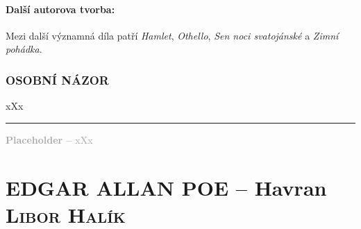 \documentclass[A4paper]{extarticle} %
\begin{document}
\subsection*{Další autorova tvorba:}
\noindent 
Mezi další významná díla patří \textit{Hamlet}, \textit{Othello}, \textit{Sen noci svatojánské} a \textit{Zimní pohádka}.






\section*{OSOBNÍ NÁZOR}
\noindent 
xXx

\vfill

\noindent\begin{minipage}{\textwidth}
    \textcolor{darkgray}{\rule{\linewidth}{0.4pt}
    \footnotesize
    \textbf{Placeholder --} xXx
    }
\end{minipage}


\newpage


\changefontsize{7pt}

\part*{EDGAR ALLAN POE -- Havran {\hfill \normalfont\tiny\textsc{Libor Halík}}}
\end{document}
